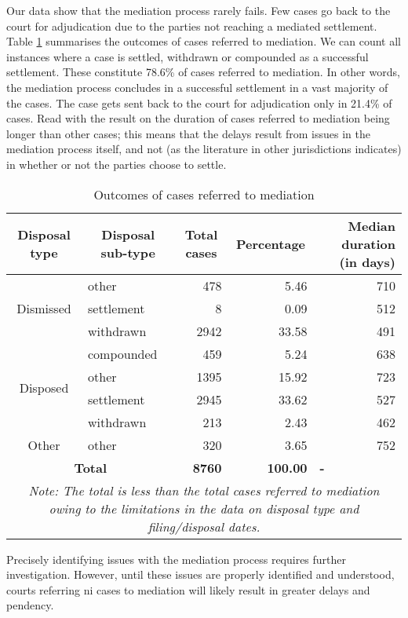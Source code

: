 Our data show that the mediation process rarely fails. Few cases go back to the court for adjudication due to the parties not reaching a mediated settlement. Table \ref{tab:mediation} summarises the outcomes of cases referred to mediation. We can count all instances where a case is settled, withdrawn or compounded as a successful settlement. These constitute 78.6\% of cases referred to mediation. In other words, the mediation process concludes in a successful settlement in a vast majority of the cases. The case gets sent back to the court for adjudication only in 21.4\% of cases. Read with the result on the duration of cases referred to mediation being longer than other cases; this means that the delays result from issues in the mediation process itself, and not (as the literature in other jurisdictions indicates) in whether or not the parties choose to settle.

{\footnotesize \begin{longtable}{@{}clrrr@{}}
 \caption{Outcomes of cases referred to mediation}
 \label{tab:mediation}\\
 \toprule
 \textbf{Disposal type} & \multicolumn{1}{c}{\textbf{Disposal sub-type}} & \multicolumn{1}{c}{\textbf{Total cases}} & \multicolumn{1}{c}{\textbf{Percentage}} & \multicolumn{1}{p{3cm}}{\textbf{Median duration (in days)}} \\
 \midrule \endhead
 \multirow{3}{*}{Dismissed} & other & 478 & 5.46 & 710 \\
 & settlement & 8 & 0.09 & 512 \\
 & withdrawn & 2942 & 33.58 & 491 \\
 \midrule
 \multirow{4}{*}{Disposed} & compounded & 459 & 5.24 & 638 \\
 & other & 1395 & 15.92 & 723 \\
 & settlement & 2945 & 33.62 & 527 \\
 & withdrawn & 213 & 2.43 & 462 \\
 \midrule
 Other & other & 320 & 3.65 & 752 \\
 \midrule
 \multicolumn{2}{c}{\textbf{Total}} & \textbf{8760} & \textbf{100.00} & \multicolumn{1}{l}{\textbf{-}} \\
 \bottomrule \multicolumn{5}{p{11cm}}{{\footnotesize \emph{Note:
 The total is less than the total cases referred to mediation owing to the limitations in the data on disposal type and filing/disposal dates.}}}
 \end{longtable}}

Precisely identifying issues with the mediation process requires further investigation. However, until these issues are properly identified and understood, courts referring \gls{ni} cases to mediation will likely result in greater delays and pendency.

